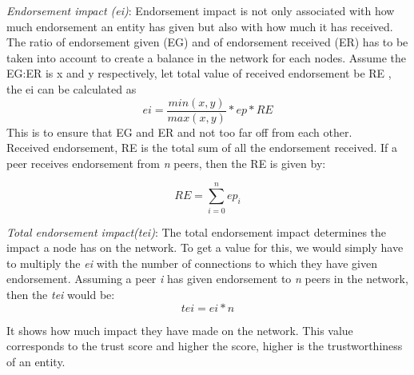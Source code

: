 \textit{Endorsement impact (ei)}: Endorsement impact is not only associated with 
how much endorsement an entity has given but also with how much it has received. 
The ratio of endorsement given (EG) and of endorsement received (ER) has to be 
taken into account to create a balance in the network for each nodes. Assume the 
EG:ER is x and y respectively, let total value of received endorsement be RE , 
the ei can be calculated as \\
\begin{equation}
	ei = \frac{min(x,y)}{max(x,y)} * ep * RE 
\end{equation}
This is to ensure that EG and ER and not too far off from each other. \\ 

Received endorsement, RE is the total sum of all the endorsement received.
If a peer receives endorsement from \textit{n} peers, then the RE is given by: 

\begin{equation}
	RE = \sum_{i=0}^{n}ep_{i}
\end{equation}

\textit{Total endorsement impact(tei)}: The total endorsement impact determines the 
impact a node has on the network. To get a value for this, we would simply have to 
multiply the \textit{ei} with the number of connections to which they have given
endorsement. Assuming a peer \textit{i} has given endorsement to \textit{n} 
peers in the network, then the \textit{tei} would be: 
\begin{equation}
	tei = ei * n 
\end{equation}

It shows how much impact they have made on the network. This value corresponds to 
the trust score and higher the score, higher is the trustworthiness of an entity.

 
 
 
 
 
 
 
 
 
 




